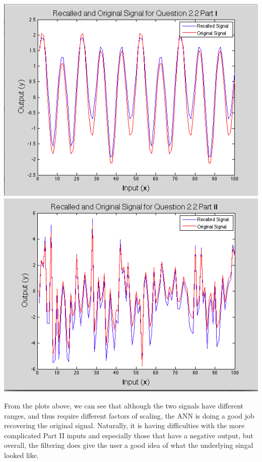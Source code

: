 \documentclass[epsfig]{article}
\begin{document}
\begin{center}
\includegraphics[scale=0.4]{pic15}
\includegraphics[scale=0.4]{pic16}
\end{center}
From the plots above, we can see that although the two signals have different ranges, and thus require different factors of scaling,  the ANN is doing a good job recovering the original signal. Naturally, it is having difficulties with the more complicated Part II inputs and especially those that have a negative output, but overall, the filtering does give the user a good idea of what the underlying singal looked like.
\end{document}
